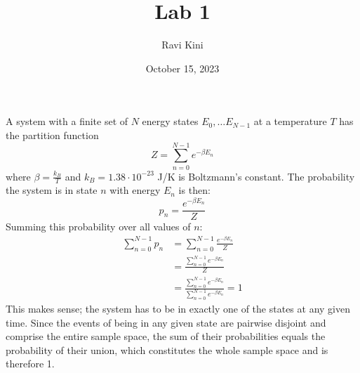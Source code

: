 \documentclass{article}
\title{Lab 1}
\author{Ravi Kini}
\date{October 15, 2023}
\begin{document}
\maketitle


\problem
A system with a finite set of $N$ energy states $E_0, \ldots E_{N-1}$ at a temperature $T$ has the partition function
\begin{equation}
    Z = \sum_{n = 0}^{N - 1} e^{-\beta E_n}
\end{equation}
where $\beta = \frac{k_B}{T}$ and $k_B = 1.38 \cdot 10^{-23}$ \unit[per-mode = symbol]
{\joule\per\kelvin} is Boltzmann's constant. The probability the system is in state $n$ with energy $E_n$ is then:
\begin{equation}
    p_n = \frac{e^{-\beta E_n}}{Z}
\end{equation}
Summing this probability over all values of $n$:
\begin{equation}
    \begin{split}
        \sum_{n=0}^{N-1} p_n & = \sum_{n=0}^{N-1} \frac{e^{-\beta E_n}}{Z} \\
        & = \frac{\sum_{n=0}^{N-1} e^{-\beta E_n}}{Z} \\
        & = \frac{\sum_{n=0}^{N-1} e^{-\beta E_n}}{\sum_{n=0}^{N-1} e^{-\beta E_n}} = 1
    \end{split}
\end{equation}
This makes sense; the system has to be in exactly one of the states at any given time. Since the events of being in any given state are pairwise disjoint and comprise the entire sample space, the sum of their probabilities equals the probability of their union, which constitutes the whole sample space and is therefore 1.

\clearpage
\end{document}
